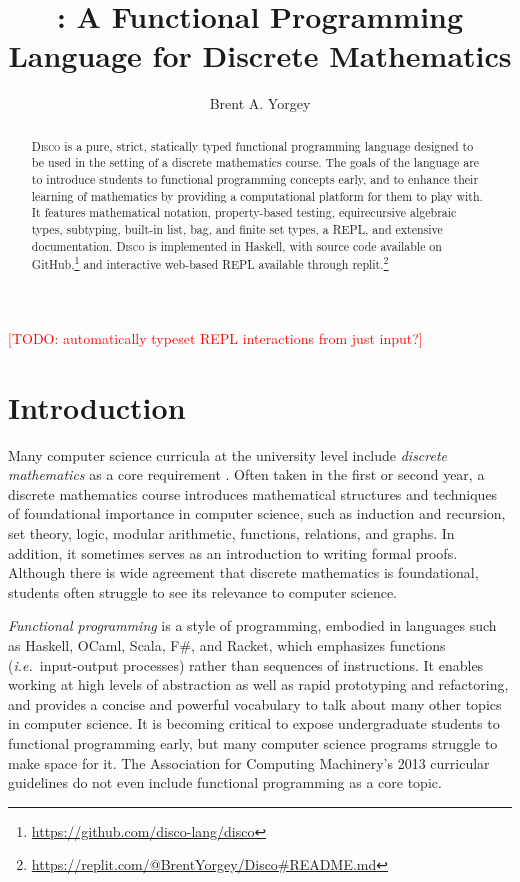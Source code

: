 \documentclass[submission,copyright,creativecommons]{eptcs}
\title{\disco: A Functional Programming Language for Discrete Mathematics}
\author{Brent A. Yorgey
\institute{Hendrix College\\ Conway, Arkansas, USA}
\email{yorgey@hendrix.edu}
}
\newcommand{\disco}{\textsc{Disco}\xspace}
\newcommand{\ie}{\emph{i.e.}\ }
\newcommand{\todo}[1]{\textcolor{red}{[TODO: #1]}}
\newcommand{\todo}[1]{}
\begin{document}
\maketitle

\todo{automatically typeset REPL interactions from just input?}

\begin{abstract}
  \disco is a pure, strict, statically typed functional programming
  language designed to be used in the setting of a discrete
  mathematics course. The goals of the language are to introduce
  students to functional programming concepts early, and to enhance
  their learning of mathematics by providing a computational platform
  for them to play with.  It features mathematical notation,
  property-based testing, equirecursive algebraic types, subtyping,
  built-in list, bag, and finite set types, a REPL, and extensive
  documentation.  \disco is implemented in Haskell, with source code
  available on
  GitHub,\footnote{\url{https://github.com/disco-lang/disco}} and
  interactive web-based REPL available through
  replit.\footnote{\url{https://replit.com/@BrentYorgey/Disco\#README.md}}
\end{abstract}

\section{Introduction}
\label{sec:introduction}

Many computer science curricula at the university level include
\emph{discrete mathematics} as a core requirement \cite{ACM:2013}.
Often taken in the first or second year, a discrete mathematics course
introduces mathematical structures and techniques of foundational
importance in computer science, such as induction and recursion, set
theory, logic, modular arithmetic, functions, relations, and graphs.
In addition, it sometimes serves as an introduction to writing formal
proofs.  Although there is wide agreement that discrete mathematics is
foundational, students often struggle to see its relevance to
computer science.

\emph{Functional programming} is a style of programming, embodied in
languages such as Haskell, OCaml, Scala, F\#, and Racket, which
emphasizes functions (\ie input-output processes) rather than
sequences of instructions. It enables working at high levels of
abstraction as well as rapid prototyping and refactoring, and provides
a concise and powerful vocabulary to talk about many other topics in
computer science.  It is becoming critical to expose undergraduate
students to functional programming early, but many computer science
programs struggle to make space for it.  The Association for Computing
Machinery's 2013 curricular guidelines \cite{ACM:2013} do not even
include functional programming as a core topic.
\end{document}
